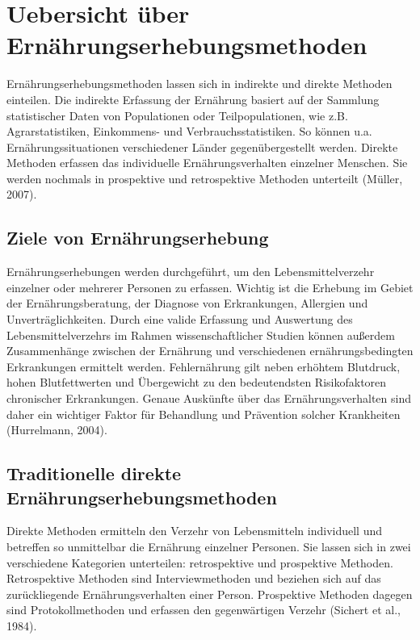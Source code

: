 \newpage
\section{Uebersicht über Ernährungserhebungsmethoden}

Ernährungserhebungsmethoden lassen sich in indirekte und direkte Methoden einteilen. Die indirekte Erfassung der Ernährung basiert auf der Sammlung statistischer Daten von Populationen oder Teilpopulationen, wie z.B. Agrarstatistiken, Einkommens- und Verbrauchsstatistiken. So können u.a. Ernährungssituationen verschiedener Länder gegenübergestellt werden. Direkte Methoden erfassen das individuelle Ernährungsverhalten einzelner Menschen. Sie werden nochmals in prospektive und retrospektive Methoden unterteilt (Müller, 2007). 

\subsection{Ziele von Ernährungserhebung}

Ernährungserhebungen werden durchgeführt, um den Lebensmittelverzehr einzelner oder mehrerer Personen zu erfassen. Wichtig ist die Erhebung im Gebiet der Ernährungsberatung, der Diagnose von Erkrankungen, Allergien und Unverträglichkeiten. Durch eine valide Erfassung und Auswertung des Lebensmittelverzehrs im Rahmen wissenschaftlicher Studien können außerdem Zusammenhänge zwischen der Ernährung und verschiedenen ernährungsbedingten Erkrankungen ermittelt werden. Fehlernährung gilt neben erhöhtem Blutdruck, hohen Blutfettwerten und Übergewicht zu den bedeutendsten Risikofaktoren chronischer Erkrankungen. Genaue Auskünfte über das Ernährungsverhalten sind daher ein wichtiger Faktor für Behandlung und Prävention solcher Krankheiten (Hurrelmann, 2004).

\subsection{Traditionelle direkte Ernährungserhebungsmethoden}

Direkte Methoden ermitteln den Verzehr von Lebensmitteln individuell und betreffen so unmittelbar die Ernährung einzelner Personen. Sie lassen sich in zwei verschiedene Kategorien unterteilen: retrospektive und prospektive Methoden. Retrospektive Methoden sind Interviewmethoden und beziehen sich auf das zurückliegende Ernährungsverhalten einer Person. Prospektive Methoden dagegen sind Protokollmethoden und erfassen den gegenwärtigen Verzehr (Sichert et al., 1984).

